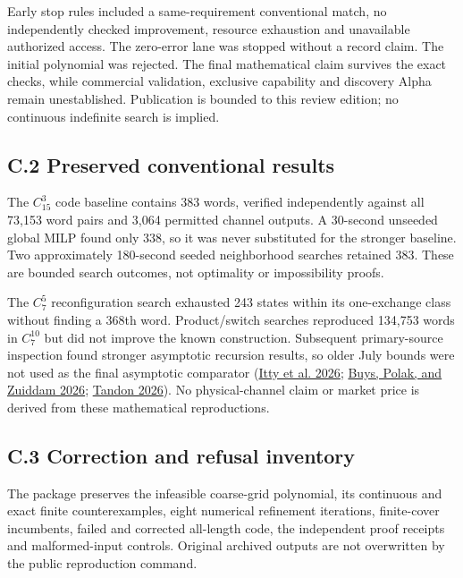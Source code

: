 \documentclass[11pt,a4paper]{article}
\begin{document}
Early stop rules included a same-requirement conventional match, no
independently checked improvement, resource exhaustion and unavailable
authorized access. The zero-error lane was stopped without a record
claim. The initial polynomial was rejected. The final mathematical claim
survives the exact checks, while commercial validation, exclusive
capability and discovery Alpha remain unestablished. Publication is
bounded to this review edition; no continuous indefinite search is
implied.


\hypertarget{c.2-preserved-conventional-results}{%
\subsection{C.2 Preserved conventional
results}\label{c.2-preserved-conventional-results}}

The \(C_{15}^3\) code baseline contains 383 words, verified
independently against all 73,153 word pairs and 3,064 permitted channel
outputs. A 30-second unseeded global MILP found only 338, so it was
never substituted for the stronger baseline. Two approximately
180-second seeded neighborhood searches retained 383. These are bounded
search outcomes, not optimality or impossibility proofs.

The \(C_7^5\) reconfiguration search exhausted 243 states within its
one-exchange class without finding a 368th word. Product/switch searches
reproduced 134,753 words in \(C_7^{10}\) but did not improve the known
construction. Subsequent primary-source inspection found stronger
asymptotic recursion results, so older July bounds were not used as the
final asymptotic comparator (\protect\hyperlink{ref-itty2026}{Itty et
al. 2026}; \protect\hyperlink{ref-buys2026}{Buys, Polak, and Zuiddam
2026}; \protect\hyperlink{ref-tandon2026}{Tandon 2026}). No
physical-channel claim or market price is derived from these
mathematical reproductions.


\hypertarget{c.3-correction-and-refusal-inventory}{%
\subsection{C.3 Correction and refusal
inventory}\label{c.3-correction-and-refusal-inventory}}

The package preserves the infeasible coarse-grid polynomial, its
continuous and exact finite counterexamples, eight numerical refinement
iterations, finite-cover incumbents, failed and corrected all-length
code, the independent proof receipts and malformed-input controls.
Original archived outputs are not overwritten by the public reproduction
command.
\end{document}
